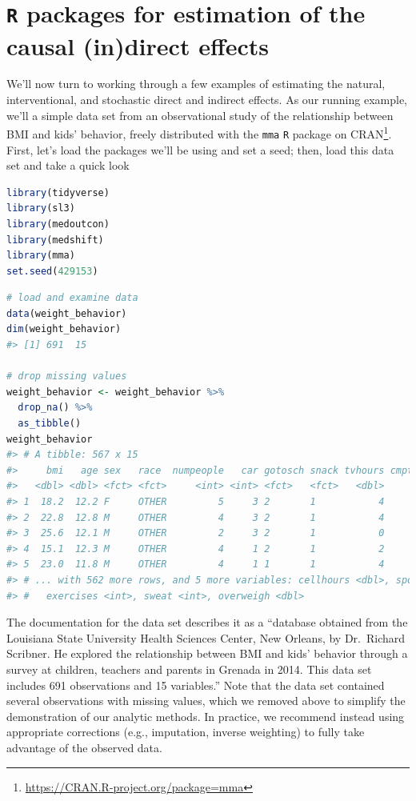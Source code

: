 \documentclass[
  12pt,
]{book}
\newcommand{\passthrough}[1]{#1}
\renewcommand{\href}[2]{#2\footnote{\url{#1}}}
\theoremstyle{definition}
\theoremstyle{definition}
\theoremstyle{definition}
\newcommand{\1}{\mathbbm{1}}
\begin{document}
\hypertarget{r-packages-for-estimation-of-the-causal-indirect-effects}{%
\chapter{\texorpdfstring{\texttt{R} packages for estimation of the causal (in)direct effects}{R packages for estimation of the causal (in)direct effects}}\label{r-packages-for-estimation-of-the-causal-indirect-effects}}

We'll now turn to working through a few examples of estimating the natural,
interventional, and stochastic direct and indirect effects. As our running
example, we'll a simple data set from an observational study of the relationship
between BMI and kids' behavior, freely distributed with the \href{https://CRAN.R-project.org/package=mma}{\passthrough{\lstinline!mma!} \passthrough{\lstinline!R!} package
on CRAN}. First, let's load the packages
we'll be using and set a seed; then, load this data set and take a quick look

\begin{lstlisting}[language=R]
library(tidyverse)
library(sl3)
library(medoutcon)
library(medshift)
library(mma)
set.seed(429153)
\end{lstlisting}

\begin{lstlisting}[language=R]
# load and examine data
data(weight_behavior)
dim(weight_behavior)
#> [1] 691  15

# drop missing values
weight_behavior <- weight_behavior %>%
  drop_na() %>%
  as_tibble()
weight_behavior
#> # A tibble: 567 x 15
#>     bmi   age sex   race  numpeople   car gotosch snack tvhours cmpthours
#>   <dbl> <dbl> <fct> <fct>     <int> <int> <fct>   <fct>   <dbl>     <dbl>
#> 1  18.2  12.2 F     OTHER         5     3 2       1           4         0
#> 2  22.8  12.8 M     OTHER         4     3 2       1           4         2
#> 3  25.6  12.1 M     OTHER         2     3 2       1           0         2
#> 4  15.1  12.3 M     OTHER         4     1 2       1           2         1
#> 5  23.0  11.8 M     OTHER         4     1 1       1           4         3
#> # ... with 562 more rows, and 5 more variables: cellhours <dbl>, sports <fct>,
#> #   exercises <int>, sweat <int>, overweigh <dbl>
\end{lstlisting}

The documentation for the data set describes it as a ``database obtained from the
Louisiana State University Health Sciences Center, New Orleans, by Dr.~Richard
Scribner. He explored the relationship between BMI and kids' behavior through a
survey at children, teachers and parents in Grenada in 2014. This data set
includes 691 observations and 15 variables.'' Note that the data set contained
several observations with missing values, which we removed above to simplify the
demonstration of our analytic methods. In practice, we recommend instead using
appropriate corrections (e.g., imputation, inverse weighting) to fully take
advantage of the observed data.
\end{document}
